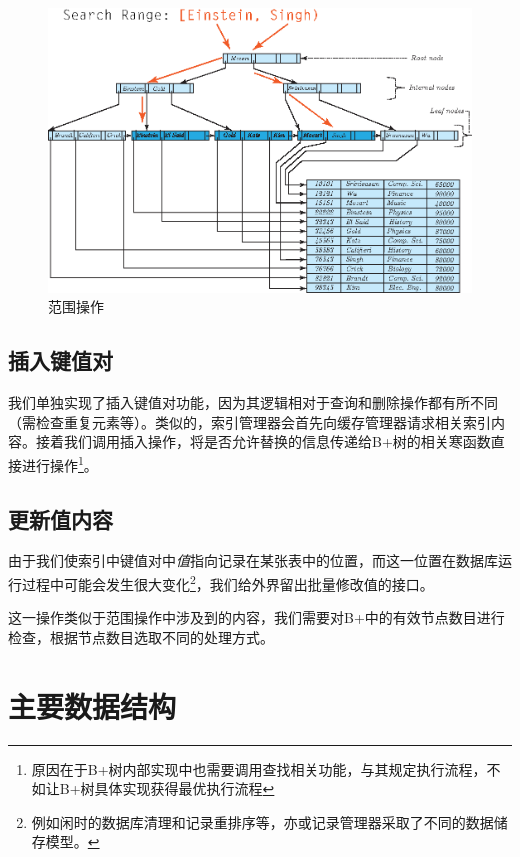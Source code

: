\documentclass[UTF8]{ctexrep} %
\begin{document}
\begin{figure}[H]
    \centering
    \includegraphics[width=0.75\linewidth]{figure/search_delete_multi.eps}
    \caption{范围操作}
    \label{fig:search_delete_multi}
\end{figure}

\subsection{插入键值对}
我们单独实现了插入键值对功能，因为其逻辑相对于查询和删除操作都有所不同（需检查重复元素等）。类似的，索引管理器会首先向缓存管理器请求相关索引内容。接着我们调用插入操作，将是否允许替换的信息传递给B+树的相关寒函数直接进行操作\footnote{原因在于B+树内部实现中也需要调用查找相关功能，与其规定执行流程，不如让B+树具体实现获得最优执行流程}。

\subsection{更新值内容}
由于我们使索引中键值对中\textit{值}指向记录在某张表中的位置，而这一位置在数据库运行过程中可能会发生很大变化\footnote{例如闲时的数据库清理和记录重排序等，亦或记录管理器采取了不同的数据储存模型。}，我们给外界留出批量修改值的接口。
\par
这一操作类似于范围操作中涉及到的内容，我们需要对B+中的有效节点数目进行检查，根据节点数目选取不同的处理方式。

\section{主要数据结构}
\end{document}
